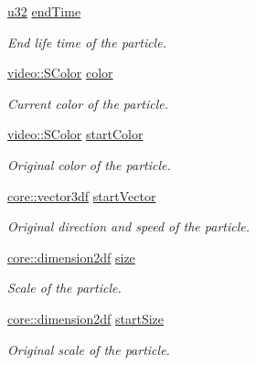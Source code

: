 \begin{DoxyCompactItemize}
\mbox{\label{structirr_1_1scene_1_1SParticle_ade0deb0f5ed021cb6aa4df9f906d4b36}} 
\hyperlink{namespaceirr_a0416a53257075833e7002efd0a18e804}{u32} \hyperlink{structirr_1_1scene_1_1SParticle_ade0deb0f5ed021cb6aa4df9f906d4b36}{end\+Time}
\begin{DoxyCompactList}\small\item\em End life time of the particle. \end{DoxyCompactList}\item 
\mbox{\label{structirr_1_1scene_1_1SParticle_a62816a5bae441b16f9bd50dfba14abc0}} 
\hyperlink{classirr_1_1video_1_1SColor}{video\+::\+S\+Color} \hyperlink{structirr_1_1scene_1_1SParticle_a62816a5bae441b16f9bd50dfba14abc0}{color}
\begin{DoxyCompactList}\small\item\em Current color of the particle. \end{DoxyCompactList}\item 
\hyperlink{classirr_1_1video_1_1SColor}{video\+::\+S\+Color} \hyperlink{structirr_1_1scene_1_1SParticle_a23325221f845c68dd331edb38d90374f}{start\+Color}
\begin{DoxyCompactList}\small\item\em Original color of the particle. \end{DoxyCompactList}\item 
\hyperlink{namespaceirr_1_1core_a06f169d08b5c429f5575acb7edbad811}{core\+::vector3df} \hyperlink{structirr_1_1scene_1_1SParticle_a5e8b1dcb8825e467b6ed2d4f48c321e2}{start\+Vector}
\begin{DoxyCompactList}\small\item\em Original direction and speed of the particle. \end{DoxyCompactList}\item 
\hyperlink{namespaceirr_1_1core_af6dc5c45ff13e7712758c827ff58676b}{core\+::dimension2df} \hyperlink{structirr_1_1scene_1_1SParticle_a548dc843e9db5db26e0005a2cb29a609}{size}
\begin{DoxyCompactList}\small\item\em Scale of the particle. \end{DoxyCompactList}\item 
\hyperlink{namespaceirr_1_1core_af6dc5c45ff13e7712758c827ff58676b}{core\+::dimension2df} \hyperlink{structirr_1_1scene_1_1SParticle_a753df7de54e742cd7d50ff10154906ee}{start\+Size}
\begin{DoxyCompactList}\small\item\em Original scale of the particle. \end{DoxyCompactList}\end{DoxyCompactItemize}


